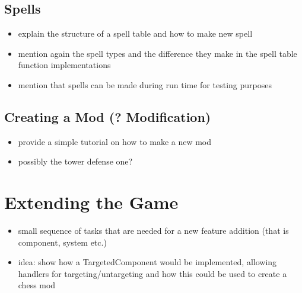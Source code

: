 \subsection{Spells}

\begin{itemize}
    \item explain the structure of a spell table and how to make new spell
    \item mention again the spell types and the difference they make
        in the spell table function implementations
    \item mention that spells can be made during run time for testing
        purposes
\end{itemize}

\subsection{Creating a Mod (? Modification)}

\begin{itemize}
    \item provide a simple tutorial on how to make a new mod
    \item possibly the tower defense one?
\end{itemize}

\section{Extending the Game}

\begin{itemize}
    \item small sequence of tasks that are needed for a new feature addition
        (that is component, system etc.)
    \item idea: show how a TargetedComponent would be implemented, allowing
        handlers for targeting/untargeting and how this could be used to create
        a chess mod
\end{itemize}
